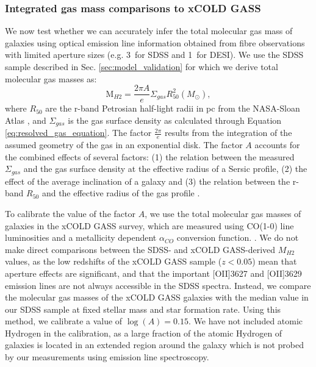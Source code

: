 \documentclass[fleqn,usenatbib]{mnras}
\begin{document}
\subsubsection{Integrated gas mass comparisons to xCOLD GASS}
\label{sec:comparison_xcoldgass}
We now test whether we can accurately infer the total molecular gas mass of galaxies using optical emission line information obtained from fibre observations with limited aperture sizes (e.g. 3\arcsec\ for SDSS and 1\arcsec\ for DESI). We use the SDSS sample described in Sec. \ref{sec:model_validation} for which we derive total molecular gas masses as:
\begin{equation}
    \textrm{M}_{H2} = \frac{2\pi A}{e} \Sigma_{gas} R_{50}^{2} (M_{\odot}), 
\end{equation}
where $R_{50}$ are the r-band Petrosian half-light radii in pc from the NASA-Sloan Atlas \citep{blanton2011}, and $\Sigma_{gas}$ is the gas surface density as calculated through Equation \ref{eq:resolved_gas_equation}. The factor $\frac{2\pi}{e}$ results from the integration of the assumed geometry of the gas in an exponential disk. The factor $A$ accounts for the combined effects of several factors: (1) the relation between the measured $\Sigma_{gas}$ and the gas surface density at the effective radius of a Sersic profile, (2) the effect of the average inclination of a galaxy and (3) the relation between the r-band $R_{50}$ and the effective radius of the gas profile \citep{casasola2017}. 

To calibrate the value of the factor $A$, we use the total molecular gas masses of galaxies in the xCOLD GASS survey, which are measured using CO(1-0) line luminosities and a metallicity dependent $\alpha_{CO}$ conversion function. \citep{saintonge2017}. We do not make direct comparisons between the SDSS- and xCOLD GASS-derived $M_{H2}$ values, as the low redshifts of the xCOLD GASS sample ($z<0.05$) mean that aperture effects are significant, and that the important [OII]3627 and [OII]3629 emission lines are not always accessible in the SDSS spectra. Instead, we compare the molecular gas masses of the xCOLD GASS galaxies with the median value in our SDSS sample at fixed stellar mass and star formation rate. Using this method, we calibrate a value of $\log(A) = 0.15$. We have not included atomic Hydrogen in the calibration, as a large fraction of the atomic Hydrogen of galaxies is located in an extended region around the galaxy which is not probed by our measurements using emission line spectroscopy.
\end{document}
